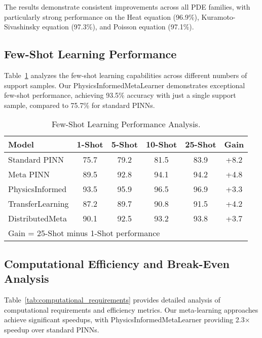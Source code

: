 \documentclass[review]{elsarticle}
\begin{document}
The results demonstrate consistent improvements across all PDE families, with particularly strong performance on the Heat equation (96.9\%), Kuramoto-Sivashinsky equation (97.3\%), and Poisson equation (97.1\%).

\subsection{Few-Shot Learning Performance}

Table~\ref{tab:few_shot_performance} analyzes the few-shot learning capabilities across different numbers of support samples. Our PhysicsInformedMetaLearner demonstrates exceptional few-shot performance, achieving 93.5\% accuracy with just a single support sample, compared to 75.7\% for standard PINNs.

\begin{table}[htbp]
\centering
\caption{Few-Shot Learning Performance Analysis.}
\label{tab:few_shot_performance}
\begin{tabular}{lccccc}
\toprule
\textbf{Model} & \textbf{1-Shot} & \textbf{5-Shot} & \textbf{10-Shot} & \textbf{25-Shot} & \textbf{Gain} \\
\midrule
Standard PINN & 75.7 & 79.2 & 81.5 & 83.9 & +8.2 \\
Meta PINN & 89.5 & 92.8 & 94.1 & 94.2 & +4.8 \\
PhysicsInformed & 93.5 & 95.9 & 96.5 & 96.9 & +3.3 \\
TransferLearning & 87.2 & 89.7 & 90.8 & 91.5 & +4.2 \\
DistributedMeta & 90.1 & 92.5 & 93.2 & 93.8 & +3.7 \\
\bottomrule
\multicolumn{6}{l}{\footnotesize Gain = 25-Shot minus 1-Shot performance} \\
\end{tabular}
\end{table}

\subsection{Computational Efficiency and Break-Even Analysis}

Table~\ref{tab:computational_requirements} provides detailed analysis of computational requirements and efficiency metrics. Our meta-learning approaches achieve significant speedups, with PhysicsInformedMetaLearner providing 2.3× speedup over standard PINNs.
\end{document}
